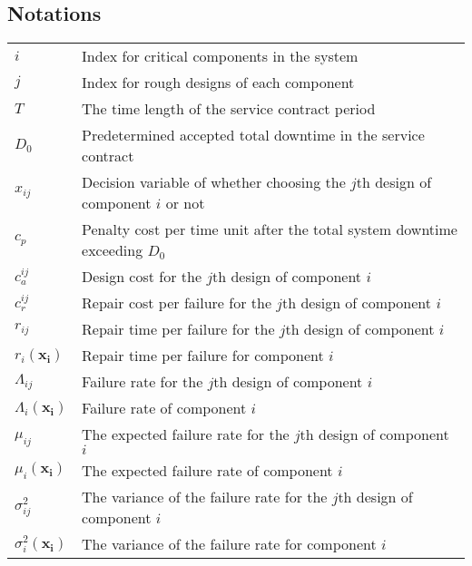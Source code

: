 \documentclass[preprint,12pt]{elsarticle}
\begin{document}
 \subsection{Notations}
   \begin{tabular}{l l}
$i$ & Index for critical components in the system\\
$j$ & Index for rough designs of each component\\
$T$ & The time length of the service contract period\\
$D_0$ & Predetermined accepted total downtime in the service contract\\
$x_{ij}$ & Decision variable of whether choosing the $j$th design of component $i$ or not\\
$c_p$ & Penalty cost per time unit after the total system downtime exceeding $D_0$\\
$c^{ij}_{a}$ & Design cost for the $j$th design of component $i$\\
$c_r^{ij}$ & Repair cost per failure for the $j$th design of component $i$\\
$r_{ij}$ & Repair time per failure for the $j$th design of component $i$\\
$r_{i}(\boldsymbol{x_{i}})$ & Repair time per failure for component $i$\\
$\Lambda_{ij}$ & Failure rate for the $j$th design of component $i$\\
$\Lambda_{i}(\boldsymbol{x_{i}})$  & Failure rate of component $i$\\
$\mu_{ij}$ & The expected failure rate for the $j$th design of component $i$ \\
$\mu_{i}(\boldsymbol{x_{i}})$ & The expected failure rate of component $i$ \\
$\sigma_{ij}^{2}$ & The variance of the failure rate for the $j$th design of component $i$\\
$\sigma_{i}^{2}(\boldsymbol{x_{i}})$ &  The variance of the failure rate for component $i$ \\

\end{tabular}
\end{document}
